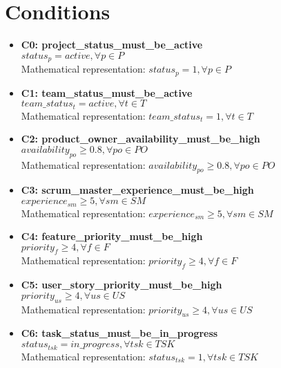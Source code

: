 \documentclass{article}
\begin{document}
\section{Conditions}
\begin{itemize}
    \item \textbf{C0: project\_status\_must\_be\_active} \\
    $status_p = active, \forall p \in P$ \\
    Mathematical representation: $status_p = 1, \forall p \in P$

    \item \textbf{C1: team\_status\_must\_be\_active} \\
    $team\_status_t = active, \forall t \in T$ \\
    Mathematical representation: $team\_status_t = 1, \forall t \in T$

    \item \textbf{C2: product\_owner\_availability\_must\_be\_high} \\
    $availability_{po} \geq 0.8, \forall po \in PO$ \\
    Mathematical representation: $availability_{po} \geq 0.8, \forall po \in PO$

    \item \textbf{C3: scrum\_master\_experience\_must\_be\_high} \\
    $experience_{sm} \geq 5, \forall sm \in SM$ \\
    Mathematical representation: $experience_{sm} \geq 5, \forall sm \in SM$

    \item \textbf{C4: feature\_priority\_must\_be\_high} \\
    $priority_f \geq 4, \forall f \in F$ \\
    Mathematical representation: $priority_f \geq 4, \forall f \in F$

    \item \textbf{C5: user\_story\_priority\_must\_be\_high} \\
    $priority_{us} \geq 4, \forall us \in US$ \\
    Mathematical representation: $priority_{us} \geq 4, \forall us \in US$

    \item \textbf{C6: task\_status\_must\_be\_in\_progress} \\
    $status_{tsk} = in\_progress, \forall tsk \in TSK$ \\
    Mathematical representation: $status_{tsk} = 1, \forall tsk \in TSK$


\end{itemize}
\end{document}
